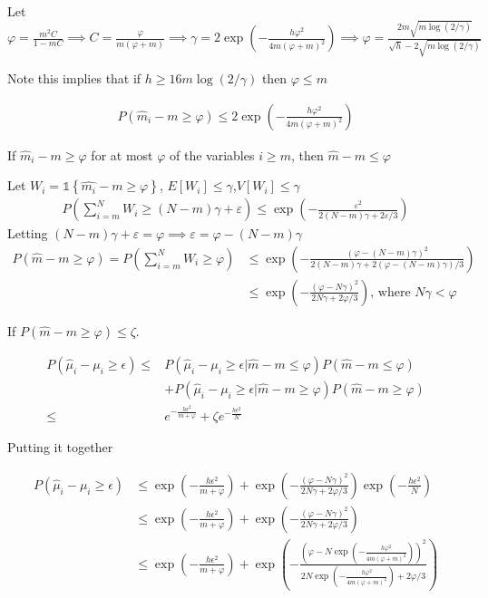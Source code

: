\documentclass{article}
\newcommand{\set}[1]{\left\{#1\right\}}
\newcommand{\ind}[1]{\mathds{1}\!\!\set{#1}}
\newcommand{\eqn}[1]{\begin{align}#1\end{align}}
\theoremstyle{plain}
\theoremstyle{definition}
\begin{document}
Let $\varphi = \frac{m^2C}{1-mC} \implies C = \frac{\varphi}{m(\varphi+m)} \implies \gamma = 2\exp(-\frac{h \varphi^2}{4m(\varphi+m)^2}) \implies \varphi = \frac{2m\sqrt{m\log(2/\gamma)}}{\sqrt{h}-2\sqrt{m \log(2/\gamma)}} $

Note this implies that if $h \geq 16m\log(2/\gamma)$ then $\varphi \leq m$

\eqn {
P(\hat{m}_i - m \geq \varphi) \leq 2\exp(-\frac{h \varphi^2}{4m(\varphi+m)^2})
}


If $\hat{m}_i - m \geq \varphi$ for at most $\varphi$ of the variables $i \geq m$, then $\hat{m} - m \leq \varphi$

Let $W_i = \ind{\hat{m_i}-m \geq \varphi}$, $E[W_i] \leq \gamma$,$V[W_i] \leq \gamma$ 
\eqn{
P(\sum_{i=m}^N W_i \geq (N-m)\gamma + \varepsilon) \leq \exp(-\frac{\varepsilon^2}{2(N-m)\gamma+2\varepsilon/3})
}
Letting $(N-m)\gamma + \varepsilon = \varphi \implies \varepsilon = \varphi - (N-m)\gamma$
\eqn{
P(\hat{m}-m \geq \varphi) =  P(\sum_{i=m}^N W_i \geq \varphi) &\leq \exp({-\frac{(\varphi-(N-m)\gamma)^2}{2(N-m)\gamma + 2(\varphi-(N-m)\gamma)/3}})\\
& \leq \exp({-\frac{(\varphi-N\gamma)^2}{2N\gamma + 2\varphi/3}}) \text{, where } N\gamma < \varphi
} 



If $P(\hat{m}-m \geq \varphi) \leq \zeta$. 


\eqn{
P(\hat{\mu}_i-\mu_i \geq \epsilon) \leq & P(\hat{\mu}_i-\mu_i \geq \epsilon |\hat{m}-m \leq \varphi )P(\hat{m}-m \leq \varphi) \\
& + P(\hat{\mu}_i-\mu_i \geq \epsilon |\hat{m}-m \geq \varphi)P(\hat{m}-m \geq \varphi)\\  \leq & e^{-\frac{h\epsilon^2}{m+\varphi}} + \zeta e^{-\frac{h \epsilon^2}{N}}
}

Putting it together 

\eqn {
P(\hat{\mu}_i-\mu_i \geq \epsilon)& \leq \exp({-\frac{h\epsilon^2}{m+\varphi}}) + \exp({-\frac{(\varphi-N\gamma)^2}{2N\gamma + 2\varphi/3}}) \exp({-\frac{h \epsilon^2}{N}})\\
& \leq \exp({-\frac{h\epsilon^2}{m+\varphi}}) + \exp({-\frac{(\varphi-N\gamma)^2}{2N\gamma + 2\varphi/3}}) \\
& \leq \exp({-\frac{h\epsilon^2}{m+\varphi}}) + \exp({-\frac{(\varphi-N\exp(-\frac{h\varphi^2}{4m(\varphi+m)^2}))^2}{2N\exp(-\frac{h\varphi^2}{4m(\varphi+m)^2}) + 2\varphi/3}})
}
\end{document}

